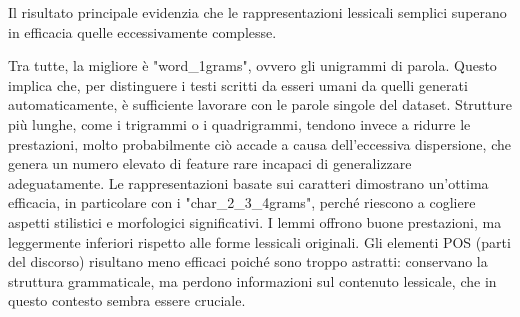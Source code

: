 \documentclass[a4paper,12pt]{report}
\begin{document}
    \begin{table}[htbp]
\centering
\small
{}
\caption{Confronto tra il modello migliore, tre modelli intermedi validi e il modello peggiore. Sono riportate le tre metriche principali calcolate tramite 5-fold cross-validation, insieme alla rispettiva deviazione standard.}
\label{tab:confronto_modelli_svm}
\end{table}
Il risultato principale evidenzia che le rappresentazioni lessicali semplici superano in efficacia quelle eccessivamente complesse.  

Tra tutte, la migliore è "word\_1grams", ovvero gli unigrammi di parola. Questo implica che, per distinguere i testi scritti da esseri umani da quelli generati automaticamente, è sufficiente lavorare con le parole singole del dataset. Strutture più lunghe, come i trigrammi o i quadrigrammi, tendono invece a ridurre le prestazioni, molto probabilmente ciò accade a causa dell'eccessiva dispersione, che genera un numero elevato di feature rare incapaci di generalizzare adeguatamente.  
Le rappresentazioni basate sui caratteri dimostrano un'ottima efficacia, in particolare con i "char\_2\_3\_4grams", perché riescono a cogliere aspetti stilistici e morfologici significativi. I lemmi offrono buone prestazioni, ma leggermente inferiori rispetto alle forme lessicali originali. Gli elementi POS (parti del discorso) risultano meno efficaci poiché sono troppo astratti: conservano la struttura grammaticale, ma perdono informazioni sul contenuto lessicale, che in questo contesto sembra essere cruciale.
\end{document}
